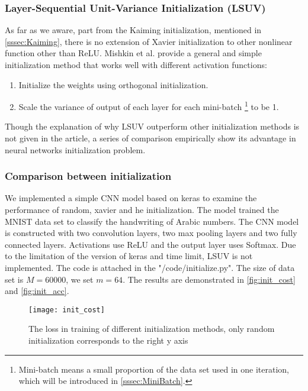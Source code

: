 \subsubsection{Layer-Sequential Unit-Variance Initialization (LSUV)}
As far as we aware, part from the Kaiming initialization, mentioned in 
\autoref{sssec:Kaiming}, there is no extension of Xavier initialization to 
other nonlinear function other than ReLU. Mishkin et al. \parencite{mishkin2015all}
provide a general and simple initialization method that works well with different 
activation functions:
\begin{enumerate}
    \item[1.] Initialize the weights using orthogonal initialization.
    \item[2.] Scale the variance of output of each layer for each mini-batch 
    \footnote{Mini-batch means a small proportion of the data set used in one 
    iteration, which will be introduced in \autoref{sssec:MiniBatch}.} to  
    be 1.
\end{enumerate}
Though the explanation of why LSUV outperform other initialization methods is
not given in the article, a series of comparison empirically show its advantage
in neural networks initialization problem.

\subsubsection{Comparison between initialization}
We implemented a simple CNN model based on keras to examine
the performance of random, xavier and he initialization. 
The model trained the MNIST data set \parencite{mnist} to 
classify the handwriting of Arabic numbers. The CNN model 
is constructed with two convolution layers, two max pooling
layers and two fully connected layers. Activations use ReLU
and the output layer uses Softmax. Due to the limitation of 
the version of keras and time limit, LSUV is not implemented.
The code is attached in the "/code/initialize.py". The size 
of data set is $ M = 60000 $, we set $ m = 64 $. The results
are demonstrated in \autoref{fig:init_cost} and \autoref{fig:init_acc}.

\begin{figure}[H]
    \centering
    \texttt{[image: init\_cost]}
    \caption{\label{fig:init_cost}The loss in training of different initialization
    methods, only random initialization corresponds to the right y axis}
\end{figure}

